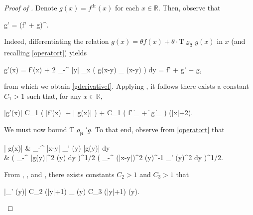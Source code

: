\documentclass{amsart}
\numberwithin{equation}{section}
\DeclareMathOperator{\dr}{dr}
\theoremstyle{remark}
\theoremstyle{definition}
\begin{document}
	
	\begin{proof}[Proof of ]
		
		Denote $g(x) = f^{\dr} (x)$ for each $x \in \mathbb{R}$. Then, observe that 
		\begin{flalign}
			\label{gderivativef}
			g' = (f' +  g)^{\dr}.
		\end{flalign} 
		
		\noindent Indeed, differentiating the relation $g(x) = \theta f(x) + \theta \cdot \bm{\mathrm{T} \varrho_{\beta}} g (x)$ in $x$ (and recalling \eqref{operatort}) yields 
		\begin{flalign*}
			g'(x) = \theta f'(x) + 2 \theta \displaystyle\int_{-\infty}^{\infty} \log |y| \cdot \partial_x \big( g(x-y) \varrho_{\beta} (x-y) \big) dy = \theta f' + \theta {} g' + \theta \bm{\mathrm{T} \varrho_{\beta}'} g,
		\end{flalign*} 
		
		\noindent from which we obtain \eqref{gderivativef}. Applying , it follows there exists a constant $C_1>1$ such that, for any $x \in \mathbb{R}$, 
		\begin{flalign}
			\label{gderivativexestimate0} 
			|g'(x)| \le C_1 \cdot ( |f'(x)| + | g(x)| ) + C_1 \cdot ( \| f' \|_{} + \|  g \|_{} ) \cdot \log (|x|+2).
		\end{flalign}
		
		We must now bound $ g$. To that end, observe from \eqref{operatort} that 
		\begin{flalign}
			\label{tderivativeg} 
			\begin{aligned} 
			| g(x)| &   \displaystyle\int_{-\infty}^{\infty} \log |x-y| \cdot \varrho_{\beta}' (y) |g(y)| dy  \\
			&  \Bigg( \displaystyle\int_{-\infty}^{\infty} |g(y)|^2 \varrho (y) dy \Bigg)^{1/2} \Bigg( \displaystyle\int_{-\infty}^{\infty} (\log |x-y|)^2 \varrho (y)^{-1} \varrho_{\beta}' (y)^2 dy \Bigg)^{1/2}.
			\end{aligned}
		\end{flalign} 
		
		\noindent From , , and , there exists constants $C_2 > 1$ and $C_3 >1$ that 
		\begin{flalign*}
			|\varrho_{\beta}' (y)| \le C_2 (|y|+1) \cdot \varrho_{\beta} (y) \le C_3 (|y|+1) \cdot \varrho (y).
		\end{flalign*}
		

\end{proof}
\end{document}

